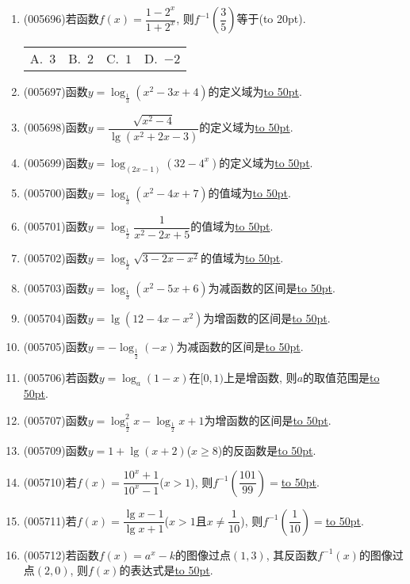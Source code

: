 \documentclass[10pt,a4paper]{article}
\newcommand{\blank}[1]{\underline{\hbox to #1pt{}}}
\newcommand{\bracket}[1]{(\hbox to #1pt{})}
\newcommand{\fourch}[4]{\par\begin{tabular}{p{.23\textwidth}p{.23\textwidth}p{.23\textwidth}p{.23\textwidth}}
A.~#1 &B.~#2& C.~#3& D.~#4
\end{tabular}}
\begin{document}
\begin{enumerate}[1.]
{}{}
\item {\tiny (005696)}若函数$f(x)=\dfrac{1-2^x}{1+2^x}$, 则$f^{-1}(\dfrac 35)$等于\bracket{20}.
\fourch{$3$}{$2$}{$1$}{$-2$}
\item {\tiny (005697)}函数$y=\log_{\frac 13}(x^2-3x+4)$的定义域为\blank{50}.
\item {\tiny (005698)}函数$y=\dfrac{\sqrt {x^2-4}}{\lg (x^2+2x-3)}$的定义域为\blank{50}.
\item {\tiny (005699)}函数$y=\log_{(2x-1)}(32-4^x)$的定义域为\blank{50}.
\item {\tiny (005700)}函数$y=\log_{\frac 13}(x^2-4x+7)$的值域为\blank{50}.
\item {\tiny (005701)}函数$y=\log_{\frac 12}\dfrac 1{x^2-2x+5}$的值域为\blank{50}.
\item {\tiny (005702)}函数$y=\log_{\frac 12}\sqrt {3-2x-x^2}$的值域为\blank{50}.
\item {\tiny (005703)}函数$y=\log_{\frac 13}(x^2-5x+6)$为减函数的区间是\blank{50}.
\item {\tiny (005704)}函数$y=\lg (12-4x-x^2)$为增函数的区间是\blank{50}.
\item {\tiny (005705)}函数$y=-\log_{\frac 12}(-x)$为减函数的区间是\blank{50}.
\item {\tiny (005706)}若函数$y=\log_a(1-x)$在$[0,1)$上是增函数, 则$a$的取值范围是\blank{50}.
\item {\tiny (005707)}函数$y=\log_{\frac 12}^2x-\log_{\frac 12}x+1$为增函数的区间是\blank{50}.
\item {\tiny (005709)}函数$y=1+\lg (x+2)$($x\ge 8$)的反函数是\blank{50}.
\item {\tiny (005710)}若$f(x)=\dfrac{10^x+1}{10^x-1}$($x>1$), 则$f^{-1}(\dfrac{101}{99})=$\blank{50}.
\item {\tiny (005711)}若$f(x)=\dfrac{\lg x-1}{\lg x+1}$($x>1$且$x\ne \dfrac 1{10}$), 则$f^{-1}(\dfrac 1{10})=$\blank{50}.
\item {\tiny (005712)}若函数$f(x)=a^x-k$的图像过点$(1, 3)$, 其反函数$f^{-1}(x)$的图像过点$(2, 0)$, 则$f(x)$的表达式是\blank{50}.

\end{enumerate}
\end{document}
